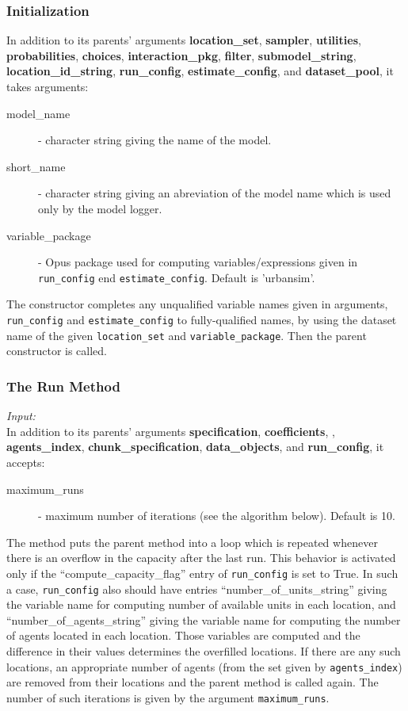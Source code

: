 \subsubsection{Initialization}
%
In addition to its parents' arguments {\bf location_set}, {\bf sampler}, {\bf utilities}, {\bf probabilities}, 
{\bf choices}, {\bf interaction_pkg}, {\bf filter}, {\bf submodel_string}, {\bf location_id_string}, 
{\bf run_config}, {\bf estimate_config}, and {\bf dataset_pool}, it takes arguments:
\begin{description}
\item[model_name] - character string giving the name of the model.
\item[short_name] - character string giving an abreviation of the model name which is used 
only by the model logger.
\item[variable_package] - Opus package used for computing variables/expressions given in \verb|run_config|
end \verb|estimate_config|. Default is 'urbansim'.
\end{description}

The constructor completes any unqualified variable \variablesindex names given in 
arguments, \verb|run_config| and \verb|estimate_config| to fully-qualified
names, by using the dataset name of the given \verb|location_set| and  \verb|variable_package|.
Then the parent constructor is called.

\subsubsection{The Run Method}
%
{\it Input:}\\[1mm]
In addition to its parents' arguments {\bf specification}, {\bf coefficients}, , {\bf agents_index},
{\bf chunk_specification}, {\bf data_objects}, and {\bf run_config}, it accepts:
\begin{description}
\item[maximum_runs] - maximum number of iterations (see the algorithm below). Default is 10.
\end{description}
The method puts the parent method
 into a loop which is repeated whenever there is an
overflow in the capacity after the last run. This behavior is
activated only if the ``compute_capacity_flag'' entry of
\verb|run_config| is set to True. In such a case, \verb|run_config|
also should have entries ``number_of_units_string'' giving the
variable \variablesindex name for computing number of available
units in each location, and ``number_of_agents_string'' giving the
variable \variablesindex name for computing the number of agents
located in each location. Those variables \variablesindex are
computed and the difference in their values determines the
overfilled locations. If there are any such locations, an
appropriate number of agents (from the set given by
\verb|agents_index|) are removed from their locations and the parent
 method is called again. The number of such iterations is
given by the argument \verb|maximum_runs|.



